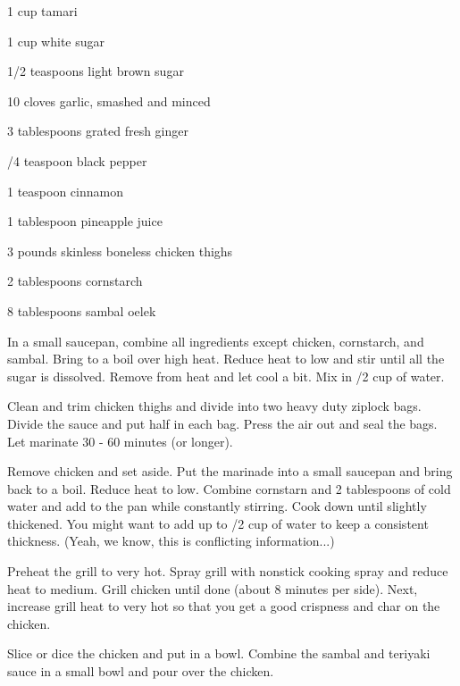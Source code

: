 \begin{IngredientsAndSteps}
    \ListIngredientsAndSteps
    {
        1 cup tamari

        1 cup white sugar

        1/2 teaspoons light brown sugar

        10 cloves garlic, smashed and minced

        3 tablespoons grated fresh ginger

        /4 teaspoon black pepper

        1 teaspoon cinnamon

        1 tablespoon pineapple juice

        3 pounds skinless boneless chicken thighs

        2 tablespoons cornstarch

        8 tablespoons sambal oelek
    }
    {
        In a small saucepan, combine all ingredients except chicken, cornstarch, and sambal.
        Bring to a boil over high heat. Reduce heat to low and stir until all the sugar is
        dissolved. Remove from heat and let cool a bit. Mix in /2 cup of water.

        Clean and trim chicken thighs and divide into two heavy duty ziplock bags. Divide the
        sauce and put half in each bag. Press the air out and seal the bags. Let marinate 30 - 60
        minutes (or longer).

        Remove chicken and set aside. Put the marinade into a small saucepan and bring back
        to a boil. Reduce heat to low. Combine cornstarn and 2 tablespoons of cold water and
        add to the pan while constantly stirring. Cook down until slightly thickened. You might
        want to add up to /2 cup of water to keep a consistent thickness. (Yeah, we know, this
        is conflicting information...)

        Preheat the grill to very hot. Spray grill with nonstick cooking spray and reduce
        heat to medium. Grill chicken until done (about 8 minutes per side). Next, increase grill
        heat to very hot so that you get a good crispness and char on the chicken.

        Slice or dice the chicken and put in a bowl. Combine the sambal and teriyaki sauce in
        a small bowl and pour over the chicken.
    }

\end{IngredientsAndSteps}

%
%
%
%
\newpage

